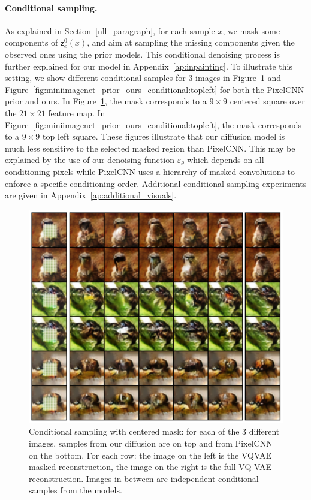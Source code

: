 \documentclass{article}
\theoremstyle{plain}
\theoremstyle{definition}
\theoremstyle{remark}
\newcommand{\latentcont}{\mathsf{z}_e}
\begin{document}
\paragraph{Conditional sampling. }
As explained in Section~\ref{nll_paragraph},  for each sample $x$,  we mask some components of $\latentcont^0(x)$, and aim at sampling the missing components given the observed ones using the prior models. This conditional denoising process is further explained for our model in Appendix~\ref{ap:inpainting}. To illustrate this setting, we show different conditional samples for 3 images in Figure~\ref{fig:miniimagenet_prior_ours_conditional} and  Figure~\ref{fig:miniimagenet_prior_ours_conditional:topleft}  for both the PixelCNN prior and ours. In Figure~\ref{fig:miniimagenet_prior_ours_conditional},  the mask corresponds to a $9\times 9$ centered square over the $21\times 21$ feature map. In Figure~\ref{fig:miniimagenet_prior_ours_conditional:topleft},  the mask corresponds to a $9\times 9$ top left square. These figures illustrate that our diffusion model is much less sensitive to the selected masked region than PixelCNN. This may be explained by the use of our denoising function $\varepsilon_\theta$ which depends on all conditioning pixels while PixelCNN uses a hierarchy of masked convolutions to enforce
a specific conditioning order. Additional conditional sampling experiments are given in Appendix~\ref{ap:additional_visuals}.

\begin{figure}
    \centering
    \includegraphics[width=.8\linewidth]{./cond_samples_center_2.pdf}

    \caption{Conditional sampling with centered mask: for each of the 3 different images, samples from our diffusion are on top and from PixelCNN on the bottom. For each row: the image on the left is the VQVAE masked reconstruction, the image on the right is the full VQ-VAE reconstruction. Images in-between are independent conditional samples from the models.}
    \label{fig:miniimagenet_prior_ours_conditional}
\end{figure}
\end{document}
